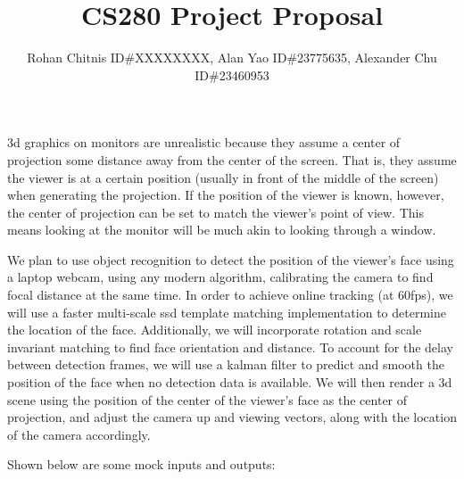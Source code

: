 \documentclass[11pt]{article}
\title{\vspace{-8ex} CS280 Project Proposal}
\author{Rohan Chitnis ID\#XXXXXXXX, Alan Yao ID\#23775635, Alexander Chu ID\#23460953 \vspace{-8ex}}
\date{}
\begin{document}
\maketitle
3d graphics on monitors are unrealistic because they assume a center of projection some distance away from the center of the screen. That is, they assume the viewer is at a certain position (usually in front of the middle of the screen) when generating the projection. If the position of the viewer is known, however, the center of projection can be set to match the viewer's point of view. This means looking at the monitor will be much akin to looking through a window. 

We plan to use object recognition to detect the position of the viewer's face using a laptop webcam, using any modern algorithm, calibrating the camera to find focal distance at the same time. In order to achieve online tracking (at 60fps), we will use a faster multi-scale ssd template matching implementation to determine the location of the face. Additionally, we will incorporate rotation and scale invariant matching to find face orientation and distance. To account for the delay between detection frames, we will use a kalman filter to predict and smooth the position of the face when no detection data is available. We will then render a 3d scene using the position of the center of the viewer's face as the center of projection, and adjust the camera up and viewing vectors, along with the location of the camera accordingly.

Shown below are some mock inputs and outputs:
\end{document}
